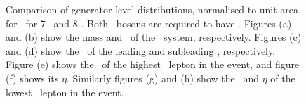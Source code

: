 \begin{figure}
{    }
        \vspace{-2mm}
        \vspace{-2mm}
    \caption{\small Comparison of generator level distributions, normalised to
    unit area, for \ZZllll\ for 7
    \tev\ and 8 \tev. Both \Z\ bosons are required to have \sstooosZ. Figures (a)
    and (b) show the mass and \pt\ of the \ZZ\ system,
    respectively. Figures (c) and (d) show the \pt\ of the
    leading and subleading \Z, respectively. Figure (e) shows the \pt\ of the highest \pt\ lepton in the event, and figure (f) shows its
   $\eta$. Similarly figures (g) and (h) show the \pt\ and $\eta$ of the lowest
   \pt\ lepton in the event.}
    \label{fig:gen-comp-7-8-ZZ}
\end{figure}

